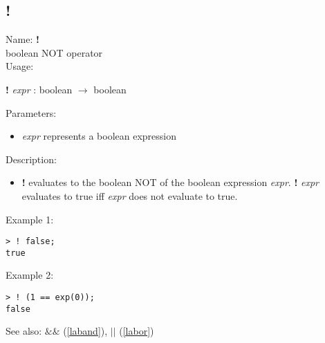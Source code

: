 \subsection{!}
\label{labnot}
\noindent Name: \textbf{!}\\
boolean NOT operator\\
\noindent Usage: 
\begin{center}
\textbf{!} \emph{expr} : \textsf{boolean} $\rightarrow$ \textsf{boolean}\\
\end{center}
Parameters: 
\begin{itemize}
\item \emph{expr} represents a boolean expression
\end{itemize}
\noindent Description: \begin{itemize}

\item \textbf{!} evaluates to the boolean NOT of the boolean expression
   \emph{expr}. \textbf{!} \emph{expr} evaluates to true iff \emph{expr} does not evaluate
   to true.
\end{itemize}
\noindent Example 1: 
\begin{center}\begin{minipage}{15cm}\begin{Verbatim}[frame=single]
> ! false;
true
\end{Verbatim}
\end{minipage}\end{center}
\noindent Example 2: 
\begin{center}\begin{minipage}{15cm}\begin{Verbatim}[frame=single]
> ! (1 == exp(0));
false
\end{Verbatim}
\end{minipage}\end{center}
See also: \textbf{$\&\&$} (\ref{laband}), \textbf{$||$} (\ref{labor})
